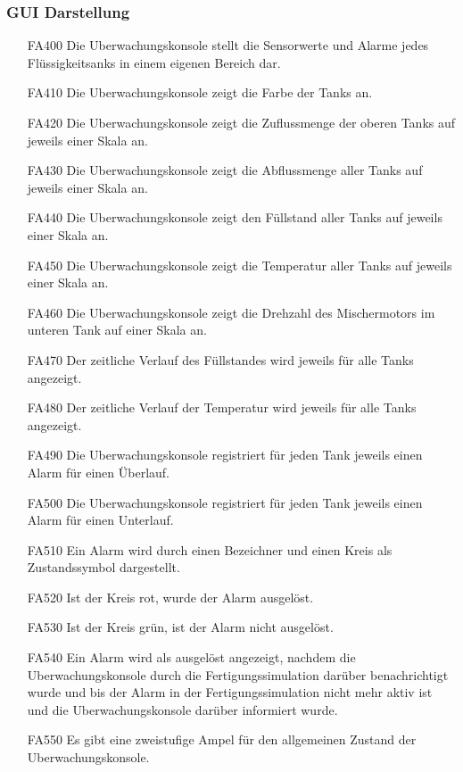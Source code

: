 \documentclass[parskip=full]{scrartcl}
\begin{document}
\subsubsection{GUI Darstellung}
\begin{enumerate}
\item[FA400] Die \gls{Uberwachungskonsole} stellt die Sensorwerte und Alarme jedes Flüssigkeitsanks in einem eigenen Bereich dar.
\item[FA410] Die \gls{Uberwachungskonsole} zeigt die Farbe der Tanks an.
\item[FA420] Die \gls{Uberwachungskonsole} zeigt die Zuflussmenge der oberen Tanks auf jeweils einer Skala an.
\item[FA430] Die \gls{Uberwachungskonsole} zeigt die Abflussmenge aller Tanks auf jeweils einer Skala an.
\item[FA440] Die \gls{Uberwachungskonsole} zeigt den Füllstand aller Tanks auf jeweils einer Skala an.
\item[FA450] Die \gls{Uberwachungskonsole} zeigt die Temperatur aller Tanks auf jeweils einer Skala an.
\item[FA460] Die \gls{Uberwachungskonsole} zeigt die Drehzahl des Mischermotors im unteren Tank auf einer Skala an.
\item[FA470] Der zeitliche Verlauf des Füllstandes wird jeweils für alle Tanks angezeigt.
\item[FA480] Der zeitliche Verlauf der Temperatur wird jeweils für alle Tanks angezeigt.
\item[FA490] Die \gls{Uberwachungskonsole} registriert für jeden Tank jeweils einen Alarm für einen Überlauf.
\item[FA500] Die \gls{Uberwachungskonsole} registriert für jeden Tank jeweils einen Alarm für einen Unterlauf.
\item[FA510] Ein Alarm wird durch einen Bezeichner und einen Kreis als Zustandssymbol dargestellt.
\item[FA520] Ist der Kreis rot, wurde der Alarm ausgelöst.
\item[FA530] Ist der Kreis grün, ist der Alarm nicht ausgelöst.
\item[FA540] Ein Alarm wird als ausgelöst angezeigt, nachdem die \gls{Uberwachungskonsole} durch die \gls{Fertigungssimulation} darüber benachrichtigt wurde und bis der Alarm in der \gls{Fertigungssimulation} nicht mehr aktiv ist und die \gls{Uberwachungskonsole} darüber informiert wurde.
\item[FA550] Es gibt eine zweistufige Ampel für den allgemeinen Zustand der \gls{Uberwachungskonsole}.

\end{enumerate}
\end{document}
